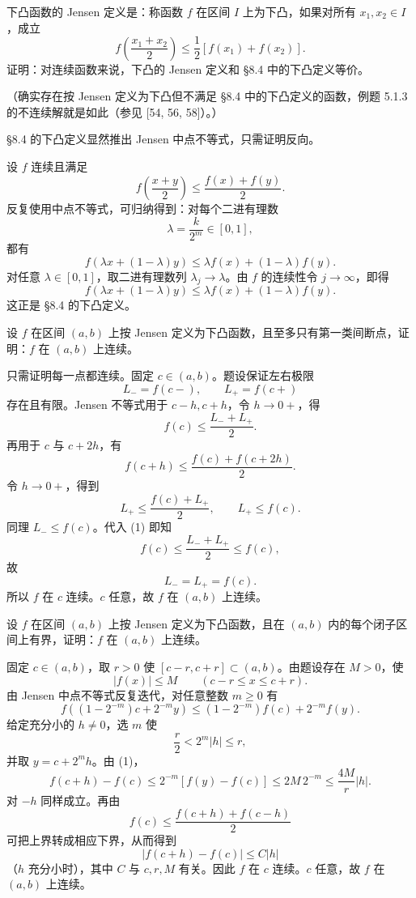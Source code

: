 \begin{xreferenceproblem}[8]
下凸函数的 Jensen 定义是：称函数 $f$ 在区间 $I$ 上为下凸，如果对所有 $x_1,x_2\in I$，成立
  \[
    f\left(\frac{x_1+x_2}{2}\right)\le\frac12[f(x_1)+f(x_2)].
  \]
  证明：对连续函数来说，下凸的 Jensen 定义和 §8.4 中的下凸定义等价。

  （确实存在按 Jensen 定义为下凸但不满足 §8.4 中的下凸定义的函数，例题 5.1.3 的不连续解就是如此（参见 [54, 56, 58]）。）
\end{xreferenceproblem}
\begin{xsolution}
§8.4 的下凸定义显然推出 Jensen 中点不等式，只需证明反向。

设 $f$ 连续且满足
\[
  f\left(\frac{x+y}{2}\right)\le\frac{f(x)+f(y)}2.
\]
反复使用中点不等式，可归纳得到：对每个二进有理数
\[
  \lambda=\frac{k}{2^m}\in[0,1],
\]
都有
\[
  f(\lambda x+(1-\lambda)y)
  \le\lambda f(x)+(1-\lambda)f(y).
\]
对任意 $\lambda\in[0,1]$，取二进有理数列 $\lambda_j\to\lambda$。由 $f$ 的连续性令 $j\to\infty$，即得
\[
  f(\lambda x+(1-\lambda)y)
  \le\lambda f(x)+(1-\lambda)f(y).
\]
这正是 §8.4 的下凸定义。
\end{xsolution}


\begin{xreferenceproblem}[9]
设 $f$ 在区间 $(a,b)$ 上按 Jensen 定义为下凸函数，且至多只有第一类间断点，证明：$f$ 在 $(a,b)$ 上连续。
\end{xreferenceproblem}
\begin{xsolution}
只需证明每一点都连续。固定 $c\in(a,b)$。题设保证左右极限
\[
  L_-=f(c-),\qquad L_+=f(c+)
\]
存在且有限。Jensen 不等式用于 $c-h,c+h$，令 $h\to0+$，得
\[
  f(c)\le\frac{L_-+L_+}{2}.
\tag{1}
\]
再用于 $c$ 与 $c+2h$，有
\[
  f(c+h)\le\frac{f(c)+f(c+2h)}2.
\]
令 $h\to0+$，得到
\[
  L_+\le\frac{f(c)+L_+}{2},
  \qquad L_+\le f(c).
\]
同理 $L_-\le f(c)$。代入 (1) 即知
\[
  f(c)\le\frac{L_-+L_+}{2}\le f(c),
\]
故
\[
  L_-=L_+=f(c).
\]
所以 $f$ 在 $c$ 连续。$c$ 任意，故 $f$ 在 $(a,b)$ 上连续。
\end{xsolution}


\begin{xreferenceproblem}[10]
设 $f$ 在区间 $(a,b)$ 上按 Jensen 定义为下凸函数，且在 $(a,b)$ 内的每个闭子区间上有界，证明：$f$ 在 $(a,b)$ 上连续。
\end{xreferenceproblem}
\begin{xsolution}
固定 $c\in(a,b)$，取 $r>0$ 使 $[c-r,c+r]\subset(a,b)$。由题设存在 $M>0$，使
\[
  |f(x)|\le M\qquad(c-r\le x\le c+r).
\]
由 Jensen 中点不等式反复迭代，对任意整数 $m\ge0$ 有
\[
  f\left((1-2^{-m})c+2^{-m}y\right)
  \le(1-2^{-m})f(c)+2^{-m}f(y).
\tag{1}
\]
给定充分小的 $h\ne0$，选 $m$ 使
\[
  \frac r2<2^m|h|\le r,
\]
并取 $y=c+2^m h$。由 (1)，
\[
  f(c+h)-f(c)
  \le2^{-m}[f(y)-f(c)]
  \le2M\,2^{-m}
  \le\frac{4M}{r}|h|.
\]
对 $-h$ 同样成立。再由
\[
  f(c)\le\frac{f(c+h)+f(c-h)}2
\]
可把上界转成相应下界，从而得到
\[
  |f(c+h)-f(c)|\le C|h|
\]
（$h$ 充分小时），其中 $C$ 与 $c,r,M$ 有关。因此 $f$ 在 $c$ 连续。$c$ 任意，故 $f$ 在 $(a,b)$ 上连续。
\end{xsolution}


